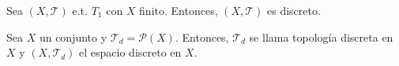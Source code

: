 \begin{ejr}[46]
  Sea $( X, \mathcal{T} )$ e.t. $T_{1}$ con $X$ finito. Entonces, $( X, \mathcal{T} )$ es discreto.
\end{ejr}

\begin{note}
  Sea $X$ un conjunto y $\mathcal{T}_{d} = \mathcal{P}(X)$. Entonces, $\mathcal{T}_{d}$ se llama topología discreta en $X$ y $( X, \mathcal{T}_{d} )$ el espacio discreto en $X$.
\end{note}

\begin{sol}
  
\end{sol}
